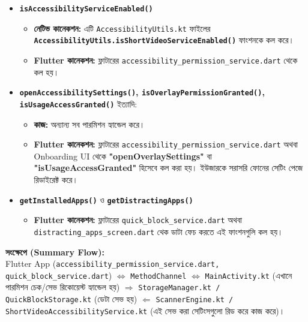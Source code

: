 \documentclass[12pt, a4paper]{article}
\begin{document}
\begin{tcolorbox}[colback=cyan!5!white,colframe=cyan!75!black,title={৫. পারমিশন এবং সেটিং ফাংশনসমূহ}]
\begin{itemize}[label=$\circ$]
    \item \textbf{\texttt{isAccessibilityServiceEnabled()}}
    \begin{itemize}[label=--]
        \item \textbf{নেটিভ কানেকশন:} এটি \texttt{AccessibilityUtils.kt} ফাইলের \textbf{\texttt{AccessibilityUtils.isShortVideoServiceEnabled()}} ফাংশনকে কল করে।
        \item \textbf{Flutter কানেকশন:} ফ্লাটারের \texttt{accessibility\_permission\_service.dart} থেকে কল হয়।
    \end{itemize}
    \item \textbf{\texttt{openAccessibilitySettings()}, \texttt{isOverlayPermissionGranted()}, \texttt{isUsageAccessGranted()}} ইত্যাদি:
    \begin{itemize}[label=--]
        \item \textbf{কাজ:} অন্যান্য সব পারমিশন হ্যান্ডেল করে।
        \item \textbf{Flutter কানেকশন:} ফ্লাটারের \texttt{accessibility\_permission\_service.dart} অথবা Onboarding UI থেকে \textbf{"openOverlaySettings"} বা \textbf{"isUsageAccessGranted"} হিসেবে কল করা হয়। ইউজারকে সরাসরি ফোনের সেটিং পেজে রিডাইরেক্ট করে।
    \end{itemize}
\end{itemize}
\end{tcolorbox}

\begin{tcolorbox}[colback=blue!5!white,colframe=blue!70!black,title={৬. অ্যাপ লিস্ট ও ফোকাস মোড}]
\begin{itemize}[label=$\circ$]
    \item \textbf{\texttt{getInstalledApps()}} ও \textbf{\texttt{getDistractingApps()}}
    \begin{itemize}[label=--]
        \item \textbf{Flutter কানেকশন:} ফ্লাটারের \texttt{quick\_block\_service.dart} অথবা \texttt{distracting\_apps\_screen.dart} থেক ডাটা ফেচ করতে এই ফাংশনগুলি কল হয়।
    \end{itemize}
\end{itemize}
\end{tcolorbox}

\vspace{0.5cm}
\textbf{সংক্ষেপে (Summary Flow):}\\
Flutter App (\texttt{accessibility\_permission\_service.dart, quick\_block\_service.dart}) $\iff$ \texttt{MethodChannel} $\iff$ \texttt{MainActivity.kt} (এখানে পারমিশন চেক/সেভ রিকোয়েস্ট হ্যান্ডেল হয়) $\Longrightarrow$ \texttt{StorageManager.kt / QuickBlockStorage.kt} (ডেটা সেভ হয়) $\Longleftarrow$ \texttt{ScannerEngine.kt / ShortVideoAccessibilityService.kt} (এই সেভ করা সেটিংসগুলো রিড করে কাজ করে)।
\end{document}
